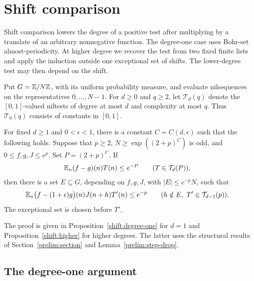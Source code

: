 \section{Shift comparison}
\label{shift:section}

Shift comparison lowers the degree of a positive test after multiplying
by a translate of an arbitrary nonnegative function.  The degree-one
case uses Bohr-set almost-periodicity.  At higher degree we recover the
test from two fixed finite lists and apply the induction outside one
exceptional set of shifts.  The lower-degree test may then depend on
the shift.

Put $G=\mathbb Z/N\mathbb Z$, with its uniform probability measure, and evaluate
nilsequences on the representatives $0,\ldots,N-1$.
For $d\geq 0$ and $q\geq2$, let $\mathcal T_d(q)$ denote the
$[0,1]$-valued niltests of degree at most $d$ and complexity at most $q$.
Thus $\mathcal T_0(q)$ consists of constants in $[0,1]$.

\begin{theorem}
\label{shift:required}
For fixed $d\geq1$ and $0<\epsilon<1$, there is a constant
$C=C(d,\epsilon)$ such that the following holds.  Suppose that
$p\geq2$, $N\geq\exp((2+p)^C)$ is odd, and
$0\leq f,g,J\leq e^p$.  Set $P=(2+p)^C$.  If
\begin{equation}\label{shift:upper-hypothesis}
 \mathbb E_n(f-g)(n)T(n)\leq e^{-P}
 \qquad(T\in\mathcal T_d(P)),
\end{equation}
then there is a set $E\subseteq G$, depending on $f,g,J$, with
$|E|\leq e^{-p}N$, such that
\begin{equation}\label{shift:required-conclusion}
 \mathbb E_n\bigl(f-(1+\epsilon)g\bigr)(n)J(n+h)T'(n)\leq e^{-p}
 \qquad(h\notin E,\ T'\in\mathcal T_{d-1}(p)).
\end{equation}
The exceptional set is chosen before $T'$.
\end{theorem}

The proof is given in Proposition~\ref{shift:degree-one} for $d=1$
and Proposition~\ref{shift:higher} for higher degrees.  The latter
uses the structural results of Section~\ref{prelim:section} and
Lemma~\ref{prelim:step-drop}.

\subsection{The degree-one argument}

